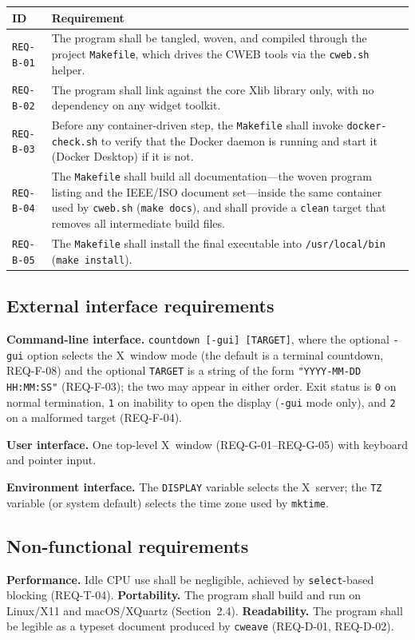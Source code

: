 \documentclass[12pt]{article}
\newcommand{\code}[1]{\texttt{#1}}
\newcommand{\req}[1]{\texttt{#1}}
\newcommand{\rrow}[2]{\req{#1} & #2 \\}
\begin{document}
\begin{longtable}{p{}p{}}
\toprule
\textbf{ID} & \textbf{Requirement} \\
\midrule
\endhead
\rrow{REQ-B-01}{The program shall be tangled, woven, and compiled through
  the project \code{Makefile}, which drives the CWEB tools via the
  \code{cweb.sh} helper.}
\rrow{REQ-B-02}{The program shall link against the core Xlib library only,
  with no dependency on any widget toolkit.}
\rrow{REQ-B-03}{Before any container-driven step, the \code{Makefile} shall
  invoke \code{docker-check.sh} to verify that the Docker daemon is
  running and start it (Docker Desktop) if it is not.}
\rrow{REQ-B-04}{The \code{Makefile} shall build all documentation---the
  woven program listing and the IEEE/ISO document set---inside the same
  container used by \code{cweb.sh} (\code{make docs}), and shall provide a
  \code{clean} target that removes all intermediate build files.}
\rrow{REQ-B-05}{The \code{Makefile} shall install the final executable into
  \code{/usr/local/bin} (\code{make install}).}
\bottomrule
\end{longtable}

\subsection{External interface requirements}

\textbf{Command-line interface.}  \code{countdown [-gui] [TARGET]}, where
the optional \code{-gui} option selects the X~window mode (the default is a
terminal countdown, REQ-F-08) and the optional \code{TARGET} is a string
of the form \code{"YYYY-MM-DD HH:MM:SS"} (REQ-F-03); the two may appear in
either order.  Exit status is \code{0} on normal termination, \code{1} on
inability to open the display (\code{-gui} mode only), and \code{2} on a
malformed target (REQ-F-04).

\medskip\noindent
\textbf{User interface.}  One top-level X~window (REQ-G-01--REQ-G-05) with
keyboard and pointer input.

\medskip\noindent
\textbf{Environment interface.}  The \code{DISPLAY} variable selects the
X~server; the \code{TZ} variable (or system default) selects the time
zone used by \code{mktime}.

\subsection{Non-functional requirements}

\textbf{Performance.}  Idle CPU use shall be negligible, achieved by
\code{select}-based blocking (REQ-T-04).  \textbf{Portability.}  The
program shall build and run on Linux/X11 and macOS/XQuartz (Section~2.4).
\textbf{Readability.}  The program shall be legible as a typeset document
produced by \code{cweave} (REQ-D-01, REQ-D-02).
\end{document}
